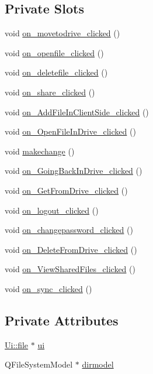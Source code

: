\subsection*{Private Slots}
\begin{DoxyCompactItemize}
\item 
void \hyperlink{classfile_a97c77bbf9c563d92e6651fa2b609435d}{on\-\_\-movetodrive\-\_\-clicked} ()
\item 
void \hyperlink{classfile_af1b36cdb7e66a7f321ac507254e1a958}{on\-\_\-openfile\-\_\-clicked} ()
\item 
void \hyperlink{classfile_a3d774be4e73149e5ed6d6099e05311f2}{on\-\_\-deletefile\-\_\-clicked} ()
\item 
void \hyperlink{classfile_ad3a3e1894c877ec13803bde2f11a5105}{on\-\_\-share\-\_\-clicked} ()
\item 
void \hyperlink{classfile_a65dbd7b46cf3d828f571de9efd1ecfc8}{on\-\_\-\-Add\-File\-In\-Client\-Side\-\_\-clicked} ()
\item 
void \hyperlink{classfile_ae02c206deb9115ac0a8b36e9b8fb6ec2}{on\-\_\-\-Open\-File\-In\-Drive\-\_\-clicked} ()
\item 
void \hyperlink{classfile_a5f7c1478a85f28353ad9995a6e92f2cb}{makechange} ()
\item 
void \hyperlink{classfile_a29d01e3696e940d091a034efe3c490b5}{on\-\_\-\-Going\-Back\-In\-Drive\-\_\-clicked} ()
\item 
void \hyperlink{classfile_a10b5c01a70194350fc18d3c0188f1027}{on\-\_\-\-Get\-From\-Drive\-\_\-clicked} ()
\item 
void \hyperlink{classfile_aa763703721e2db4c839147a73e79e45f}{on\-\_\-logout\-\_\-clicked} ()
\item 
void \hyperlink{classfile_a6b18b0f0a7708bc43b9a381d59afd2d4}{on\-\_\-changepassword\-\_\-clicked} ()
\item 
void \hyperlink{classfile_a01f5b0626483784421126b0eaab1e071}{on\-\_\-\-Delete\-From\-Drive\-\_\-clicked} ()
\item 
void \hyperlink{classfile_a4266ad358b2201a0f3375013f01f2bc5}{on\-\_\-\-View\-Shared\-Files\-\_\-clicked} ()
\item 
void \hyperlink{classfile_a804077e164f37af9aa43c28614100cd0}{on\-\_\-sync\-\_\-clicked} ()
\end{DoxyCompactItemize}
\subsection*{Private Attributes}
\begin{DoxyCompactItemize}
\item 
\hyperlink{classUi_1_1file}{Ui\-::file} $\ast$ \hyperlink{classfile_a54156dd94ca0eb23b6465cbfc8e23b3e}{ui}
\item 
Q\-File\-System\-Model $\ast$ \hyperlink{classfile_a86cd6a7325c283ae13313938ce896442}{dirmodel}
\end{DoxyCompactItemize}



